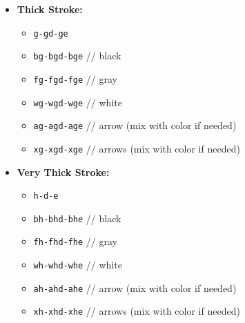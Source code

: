 \documentclass{article}
\begin{document}
\begin{multicols}{2}
\begin{itemize}[leftmargin=*]
    \item \textbf{Thick Stroke:}
    \begin{itemize}[label={}]
        \item \texttt{g-gd-ge}
        \item \texttt{bg-bgd-bge} // black
        \item \texttt{fg-fgd-fge} // gray
        \item \texttt{wg-wgd-wge} // white
        \item \texttt{ag-agd-age} // arrow (mix with color if needed)
        \item \texttt{xg-xgd-xge} // arrows (mix with color if needed)
    \end{itemize}

    \item \textbf{Very Thick Stroke:}
    \begin{itemize}[label={}]
        \item \texttt{h-d-e}
        \item \texttt{bh-bhd-bhe} // black
        \item \texttt{fh-fhd-fhe} // gray
        \item \texttt{wh-whd-whe} // white
        \item \texttt{ah-ahd-ahe} // arrow (mix with color if needed)
        \item \texttt{xh-xhd-xhe} // arrows (mix with color if needed)
    \end{itemize}
\end{itemize}

\end{multicols}

\vspace{0.5cm}
\end{document}
